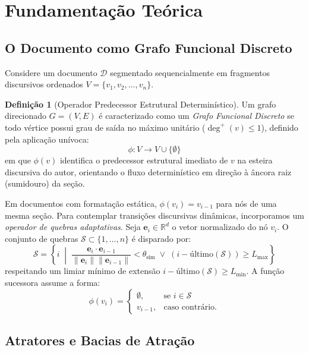 \documentclass[10pt,twocolumn]{article}
\theoremstyle{definition}
\newtheorem{definition}{Definição}
\begin{document}
\section{Fundamentação Teórica}

\subsection{O Documento como Grafo Funcional Discreto}

Considere um documento $\mathcal{D}$ segmentado sequencialmente em fragmentos discursivos ordenados $V = \{v_1, v_2, \dots, v_n\}$.

\begin{definition}[Operador Predecessor Estrutural Determinístico]
Um grafo direcionado $G = (V, E)$ é caracterizado como um \textit{Grafo Funcional Discreto} se todo vértice possui grau de saída no máximo unitário ($\deg^+(v) \le 1$), definido pela aplicação unívoca:
\begin{equation}
\phi: V \to V \cup \{\emptyset\}
\end{equation}
em que $\phi(v)$ identifica o predecessor estrutural imediato de $v$ na esteira discursiva do autor, orientando o fluxo determinístico em direção à âncora raiz (sumidouro) da seção.
\end{definition}

Em documentos com formatação estática, $\phi(v_i) = v_{i-1}$ para nós de uma mesma seção. Para contemplar transições discursivas dinâmicas, incorporamos um \textit{operador de quebras adaptativas}. Seja $\mathbf{e}_i \in \mathbb{R}^d$ o vetor normalizado do nó $v_i$. O conjunto de quebras $\mathcal{S} \subset \{1, \dots, n\}$ é disparado por:
\begin{equation}
\mathcal{S} = \left\{ i \;\middle|\; \frac{\mathbf{e}_i \cdot \mathbf{e}_{i-1}}{\|\mathbf{e}_i\| \|\mathbf{e}_{i-1}\|} < \theta_{\text{sim}} \;\lor\; (i - \text{último}(\mathcal{S})) \ge L_{\max} \right\}
\end{equation}
respeitando um limiar mínimo de extensão $i - \text{último}(\mathcal{S}) \ge L_{\min}$. A função sucessora assume a forma:
\begin{equation}
\phi(v_i) = \begin{cases}
\emptyset, & \text{se } i \in \mathcal{S} \\
v_{i-1}, & \text{caso contrário.}
\end{cases}
\end{equation}

\subsection{Atratores e Bacias de Atração}
\end{document}
